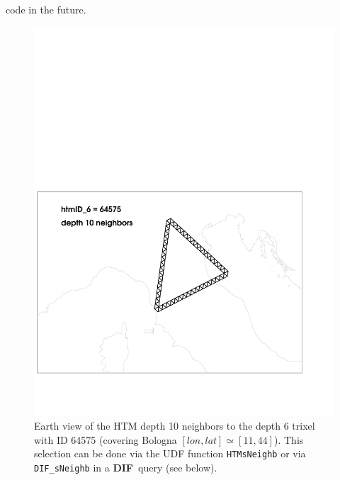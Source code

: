 \documentclass[10pt,titlepage]{article}
\newcommand{\dif}{\textbf{\small DIF}}
\begin{document}
code in the future.
%
\begin{figure}[hbtp]
\begin{center}
\includegraphics[trim=1.5cm 4cm 1.5cm 4cm, width=14cm, clip,keepaspectratio]{includes/htm6-10neighb_plot}
\end{center}
\caption{Earth view of the HTM depth 10 neighbors to the depth 6 trixel with
ID 64575 (covering Bologna $[lon,lat] \simeq [11,44]$). This selection can
be done via the UDF function \texttt{HTMsNeighb} or via \texttt{DIF\_sNeighb}
in a \dif\ query (see below).}
\label{fig:htmsneighb}
\end{figure}
\end{document}

